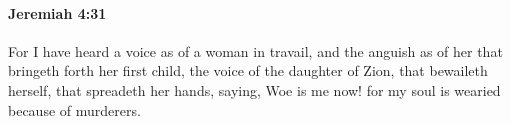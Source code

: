 
		\paragraph{Jeremiah 4:31} %
			\label{JEREMIAH-4-31}

			For I have heard a voice as of a woman in travail, and the anguish as of her that bringeth forth her first child, the voice of the daughter of Zion, that bewaileth herself, that spreadeth her hands, saying, Woe is me now! for my soul is wearied because of murderers.

